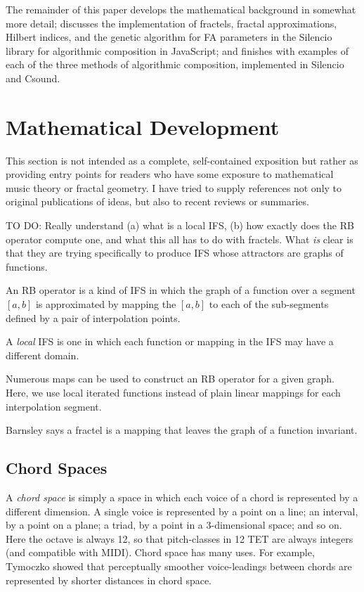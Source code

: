 \documentclass[english,11pt,letterpaper,onecolumn]{scrartcl}
\numberwithin{equation}{section}
\begin{document}
The remainder of this paper develops the mathematical background in somewhat 
more detail; discusses the implementation of fractels, fractal approximations, 
Hilbert indices, and the genetic algorithm for FA parameters in the Silencio 
library for algorithmic composition in JavaScript; and finishes with examples 
of each of the three methods of algorithmic composition, implemented in 
Silencio and Csound.

\section{Mathematical Development}

This section is not intended as a complete, self-contained exposition but 
rather as providing entry points for readers who have some exposure to 
mathematical music theory or fractal geometry. I have tried to supply 
references not only to original publications of ideas, but also to recent 
reviews or summaries.

TO DO: Really understand (a) what is a local IFS, (b) how exactly does the RB 
operator compute one, and what this all has to do with fractels. What 
\textit{is\textbf{}} clear is that they are trying specifically to produce IFS 
whose attractors are graphs of functions.

An RB operator is a kind of IFS in which the graph of a function over a segment 
$[a, b]$ is approximated by mapping the $[a, b]$ to each of the sub-segments 
defined by a pair of interpolation points.

A \textit{local} IFS is one in which each function or mapping in the IFS may 
have a different domain.

Numerous maps can be used to construct an RB operator for a given graph. Here, 
we use local iterated functions 
instead of plain linear mappings for each interpolation segment.

Barnsley says a fractel is a mapping that leaves the graph of a function 
invariant.

\subsection{Chord Spaces}

A \textit{chord space} is simply a space in which each voice of a chord is 
represented by a different dimension. A single voice is represented by a point 
on a line; an interval, by a point on a plane; a triad, by a point in a 
3-dimensional space; and so on. Here the octave is always 12, so that 
pitch-classes in 12 TET are always integers (and compatible with MIDI). Chord 
space has many uses. For example, Tymoczko \cite{tymoczko2006geometry, 
tymoczko2011geometry} showed that perceptually smoother voice-leadings between 
chords are represented by shorter distances in chord space. 
                  
\end{document}
